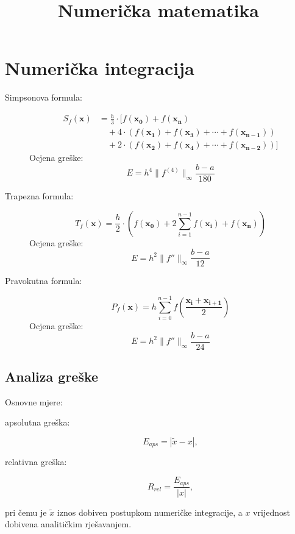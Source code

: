 \documentclass{article}
\title{Numerička matematika}
\date{}
\newcommand{\doccol}{blue}
\begin{document}
\maketitle

\section{Numerička integracija}
\begin{description}
  \item[Simpsonova formula:]
  \begin{align}
  S_f(\mathbf{x}) &= \frac{h}{3} \cdot \big [ f(\mathbf{x_0}) + f(\mathbf{x_n}) \nonumber \\
   &\quad+ 4 \cdot  ( f(\mathbf{x_1}) + f(\mathbf{x_3}) + \cdots + f(\mathbf{x_{n-1}}) ) \nonumber \\
   &\quad+ 2 \cdot ( f(\mathbf{x_2}) + f(\mathbf{x_4}) + \cdots + f(\mathbf{x_{n-2}}) ) \big ] 
  \end{align}
  Ocjena greške:
  $$E = h^4\|f^{(4)}\|_\infty \dfrac{b-a}{180}$$
  \item[Trapezna formula:]
  \begin{equation}
  T_f(\mathbf{x}) = \frac{h}{2} \cdot \left ( f(\mathbf{x_0}) + 2\sum\limits_{i=1}^{n-1} f(\mathbf{x_i}) + f(\mathbf{x_n}) \right )
  \end{equation}
  Ocjena greške:
  $$E = h^2\|f''\|_\infty \dfrac{b-a}{12}$$
  \item[Pravokutna formula:]
  \begin{equation}
  P_f(\mathbf{x}) = h \sum\limits_{i=0}^{n-1} f \left ( \frac{\mathbf{x_i} + \mathbf{x_{i+1}}}{2} \right )
  \end{equation}
  Ocjena greške:
  $$E = h^2\|f''\|_\infty \dfrac{b-a}{24}$$
\end{description}

\subsection{Analiza greške}
Osnovne mjere:
\begin{description}
  \item[apsolutna greška:] $$E_{aps} = | \tilde  x - x |,$$
  \item[relativna greška:] $$R_{rel} = \frac{E_{aps}}{|x|},$$
\end{description}
pri čemu je $\tilde x$ iznos dobiven postupkom numeričke integracije, a $x$ vrijednost dobivena analitičkim rješavanjem.
\end{document}
